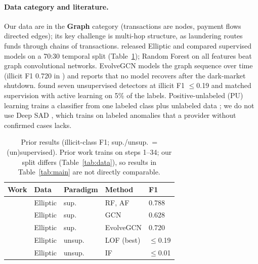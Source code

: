 \documentclass[11pt]{article}
\begin{document}
\paragraph{Data category and literature.}
Our data are in the \textbf{Graph} category (transactions are nodes, payment flows directed edges); its key challenge is multi-hop structure, as laundering routes funds through chains of transactions.
\citet{weber2019aml} released Elliptic and compared supervised models on a 70:30 temporal split (Table~\ref{tab:related}); Random Forest on all features beat graph convolutional networks.
EvolveGCN \citep{pareja2020evolvegcn} models the graph sequence over time (illicit F1 0.720 in \citealp{weber2019aml}) and reports that no model recovers after the dark-market shutdown.
\citet{lorenz2020label} found seven unsupervised detectors at illicit F1 ${\le}$0.19 and matched supervision with active learning on 5\% of the labels.
Positive-unlabeled (PU) learning trains a classifier from one labeled class plus unlabeled data \citep{elkan2008pu,bekker2020pu}; we do not use Deep SAD \citep{ruff2020deepsad}, which trains on labeled anomalies that a provider without confirmed cases lacks.

\begin{table}[t]
\centering\small
\setlength{\tabcolsep}{2.4pt}
\begin{tabular}{@{}lllll@{}}
\toprule
Work & Data & Paradigm & Method & F1 \\
\midrule
\citet{weber2019aml} & Elliptic & sup. & RF, AF & 0.788 \\
\citet{weber2019aml} & Elliptic & sup. & GCN & 0.628 \\
\citet{weber2019aml} & Elliptic & sup. & EvolveGCN & 0.720 \\
\citet{lorenz2020label} & Elliptic & unsup. & LOF (best) & $\le$0.19 \\
\citet{lorenz2020label} & Elliptic & unsup. & IF & $\le$0.01 \\
\bottomrule
\end{tabular}
\caption{Prior results (illicit-class F1; sup./unsup.\ = (un)supervised). Prior work trains on steps 1--34; our split differs (Table~\ref{tab:data}), so results in Table~\ref{tab:main} are not directly comparable.}
\label{tab:related}
\end{table}
\end{document}
